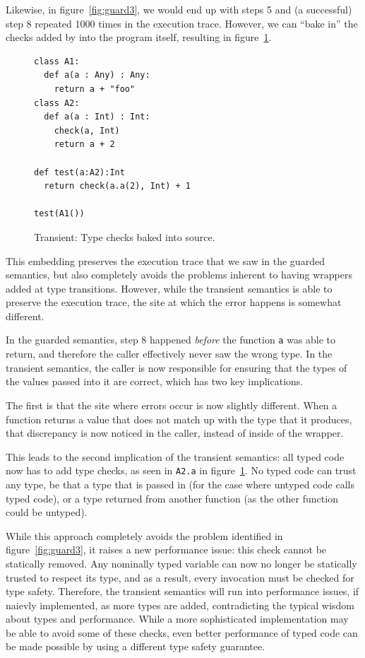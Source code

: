 \documentclass[a4paper,USenglish]{tex/lipics-v2016}
\begin{document}
Likewise, in figure~\ref{fig:guard3}, we would end up with steps 5 and (a
successful) step 8 repeated 1000 times in the execution trace. However, we
can ``bake in'' the checks added by  into the program itself,
resulting in figure~\ref{fig:trans1}.

\begin{figure}[h]
\begin{verbatim}
class A1:
  def a(a : Any) : Any:
    return a + "foo"
class A2:
  def a(a : Int) : Int:
    check(a, Int)
    return a + 2

def test(a:A2):Int
  return check(a.a(2), Int) + 1

test(A1())
\end{verbatim}
\caption{Transient: Type checks baked into source.}
\label{fig:trans1}
\end{figure}

This embedding preserves the execution trace that we saw in the guarded
semantics, but also completely avoids the problems inherent to having
wrappers added at type transitions. However, while the transient semantics
is able to preserve the execution trace, the site at which the error happens
is somewhat different.

In the guarded semantics, step 8 happened \emph{before} the function
\verb|a| was able to return, and therefore the caller effectively never saw
the wrong type. In the transient semantics, the caller is now responsible
for ensuring that the types of the values passed into it are correct, which
has two key implications.

The first is that the site where errors occur is now slightly
different. When a function returns a value that does not match up with the
type that it produces, that discrepancy is now noticed in the caller,
instead of inside of the wrapper.

This leads to the second implication of the transient semantics: all typed
code now has to add type checks, as seen in \verb|A2.a| in
figure~\ref{fig:trans1}. No typed code can trust any type, be that a type
that is passed in (for the case where untyped code calls typed code), or a
type returned from another function (as the other function could be
untyped).

While this approach completely avoids the problem identified in
figure~\ref{fig:guard3}, it raises a new performance issue: this check
cannot be statically removed. Any nominally typed variable can now no longer
be statically trusted to respect its type, and as a result, every invocation
must be checked for type safety. Therefore, the transient semantics will run
into performance issues, if naievly implemented, as more types are added,
contradicting the typical wisdom about types and performance. While a more
sophisticated implementation may be able to avoid some of these checks, even
better performance of typed code can be made possible by using a different
type safety guarantee.
\end{document}

